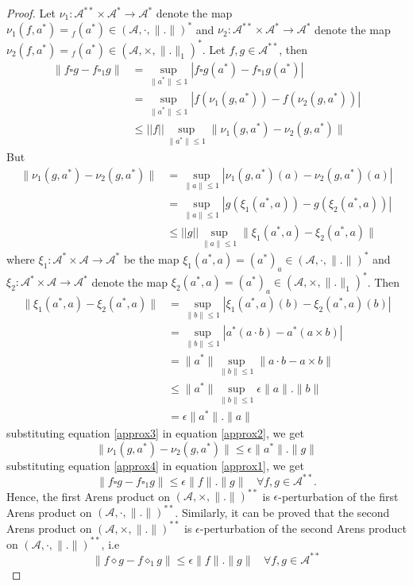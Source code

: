 \documentclass[pdflatex,sn-mathphys-num]{sn-jnl}%
\theoremstyle{thmstyleone}%
\theoremstyle{thmstyletwo}%
\theoremstyle{thmstylethree}%
\begin{document}
 \begin{proof}
 	Let $\nu_1:\mathcal A^{**}\times \mathcal A^*\to \mathcal A^*$ denote the map $\nu_1(f,a^*)={}_f(a^*)\in (\mathcal A, \cdot,\|.\|)^*$ and $\nu_2:\mathcal A^{**}\times \mathcal A^*\to \mathcal A^*$ denote the map $\nu_2(f,a^*)={}_f(a^*)\in (\mathcal A, \times, \|.\|_1)^*$. 
 	Let $f,g\in \mathcal A^{**}$, then
 	\begin{align}\label{approx1}
 		\|f\square g-f\square_1g\|&=\sup_{\|a^*\|\leq 1}|f\square g(a^*)-f\square_1g(a^*)| \nonumber\\&=\sup_{\|a^*\|\leq 1}|f(\nu_1(g,a^*))-f(\nu_2(g,a^*))|\nonumber\\&\leq ||f||\sup_{\|a^*\|\leq 1}\|\nu_1(g,a^*)-\nu_2(g,a^*)\|
 	\end{align}
 	But 
 	\begin{align}\label{approx2}
 	\|\nu_1(g,a^*)-\nu_2(g,a^*)\|&=\sup_{\|a\|\leq 1}|\nu_1(g,a^*)(a)-\nu_2(g,a^*)(a)|\nonumber\\&=\sup_{\|a\|\leq 1}|g(\xi_1(a^*,a))-g(\xi_2(a^*,a))|\nonumber\\&\leq ||g||\sup_{\|a\|\leq 1}\|\xi_1(a^*,a)-\xi_2(a^*,a)\|
 	\end{align}
 	where $\xi_1:\mathcal A^*\times \mathcal A\to \mathcal A^*$ be the map $\xi_1(a^*,a)=(a^*)_a\in (\mathcal A,\cdot, \|.\|)^*$ and $\xi_2:\mathcal A^*\times \mathcal A\to \mathcal A^*$ denote the map $\xi_2(a^*,a)=(a^*)_a\in (\mathcal A, \times ,\|.\|_1)^*$. Then
 	 \begin{align}\label{approx3}
\|\xi_1(a^*,a)-\xi_2(a^*,a)\|&=\sup_{\|b\|\leq 1}|\xi_1(a^*,a)(b)-\xi_2(a^*,a)(b)|\nonumber\\&=\sup_{\|b\|\leq 1}|a^*(a\cdot b)-a^*(a\times b)|\nonumber\\&=\|a^*\|\sup_{\|b\|\leq 1}\|a\cdot b-a\times b\| \nonumber\\&\leq \|a^*\|\sup_{\|b\|\leq 1}\epsilon\|a\|.\|b\|\nonumber\\&=\epsilon\|a^*\|.\|a\|
 	\end{align}
 	substituting equation \ref{approx3} in equation \ref{approx2}, we get \begin{equation}\label{approx4}\|\nu_1(g,a^*)-\nu_2(g,a^*)\|\leq \epsilon\|a^*\|.\|g\|\end{equation}
 	substituting equation \ref{approx4} in equation \ref{approx1}, we get $$	\|f\square g-f\square_1g\|\leq \epsilon \|f\|.\|g\|~~~~\forall f,g\in \mathcal A^{**}.$$
 	Hence, the first Arens product on $(\mathcal A, \times ,\|.\|)^{**}$ is $\epsilon$-perturbation of the first Arens product on $(\mathcal A, \cdot, \|.\|)^{**}$. Similarly, it can be proved that the second Arens product on $(\mathcal A, \times ,\|.\|)^{**}$ is $\epsilon$-perturbation of the second Arens product on $(\mathcal A, \cdot, \|.\|)^{**}$, i.e
 	 $$	\|f\diamond g-f\diamond_1g\|\leq \epsilon \|f\|.\|g\| ~~~~\forall f,g\in \mathcal A^{**}$$
 	 \end{proof}
\end{document}
